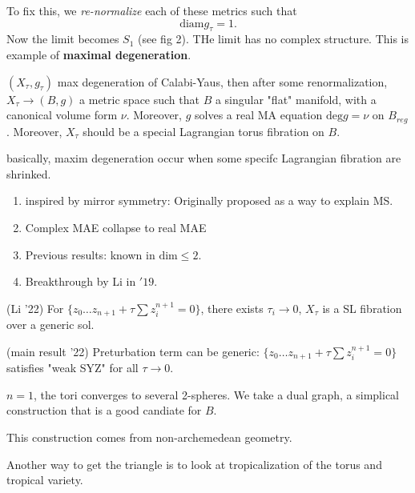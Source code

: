 To fix this, we \textit{re-normalize} each of these metrics such that
\[
	\text{diam}g_\tau = 1
.\] 
Now the limit becomes $S_1$ (see fig 2). THe limit has no complex structure. This is example of \textbf{maximal degeneration}.

\begin{conjecture}
	$(X_\tau, g_\tau)$ max degeneration of Calabi-Yaus, then after some renormalization,
	$X_\tau \to (B, g)$ a metric space such that $B$ a singular "flat" manifold, with a canonical volume form $\nu$. Moreover, $g$ solves a real MA equation $\text{deg}g = \nu$ on $B_{reg}$.
	Moreover, $X_\tau$ should be a special Lagrangian torus fibration on $B$.
\end{conjecture}

basically, maxim degeneration occur when some specifc Lagrangian fibration are shrinked.

\begin{remark}
	\begin{enumerate}
		\item inspired by mirror symmetry: Originally proposed as a way to explain MS.
		\item Complex MAE collapse to real MAE
		\item Previous results: known in $\text{dim} \le 2$.
		\item Breakthrough by Li in $'19$. 
	\end{enumerate}
\end{remark}
 \begin{theorem}(Li '22)
 	For $\{z_0 \ldots z_{n+1} + \tau \sum z_i^{n+1} = 0\} $, there exists $\tau_i \to 0$, $X_\tau$ is a SL fibration over a generic sol.
 \end{theorem}

\begin{theorem}
	(main result '22)
	Preturbation term can be generic: 
$\{z_0 \ldots z_{n+1} + \tau \sum z_i^{n+1} = 0\} $ satisfies "weak SYZ" for all $\tau \to  0$.
\end{theorem}

\begin{example}
	$n = 1$, the tori converges to several 2-spheres. We take a dual graph, a simplical construction that is a good candiate for $B$. 

	This construction comes from non-archemedean geometry.

	Another way to get the triangle is to look at tropicalization of the torus and tropical variety.
\end{example}

